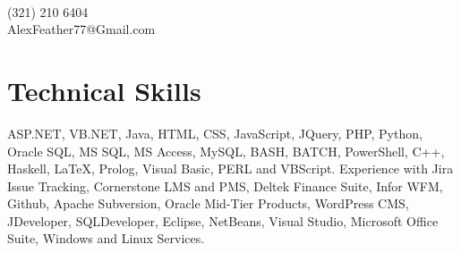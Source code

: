 \documentclass[12pt]{article}
\begin{document}
\pagestyle{empty}
\selectfont

{\\
\vspace{0.1cm}(321) 210 6404\\\vspace{0.1cm}AlexFeather77@Gmail.com\\}
\vspace{0.4cm}

\section*{\selectfont Technical Skills}
\small{ASP.NET, VB.NET, Java, HTML, CSS, JavaScript, JQuery, PHP, Python, Oracle SQL, MS SQL, MS Access, MySQL, BASH, BATCH, PowerShell, C++, Haskell, \LaTeX, Prolog, Visual Basic, PERL and VBScript. Experience with Jira Issue Tracking, Cornerstone LMS and PMS, Deltek Finance Suite, Infor WFM, Github, Apache Subversion, Oracle Mid-Tier Products, WordPress CMS, JDeveloper, SQLDeveloper, Eclipse, NetBeans, Visual Studio, Microsoft Office Suite, Windows and Linux Services.}
\end{document}
